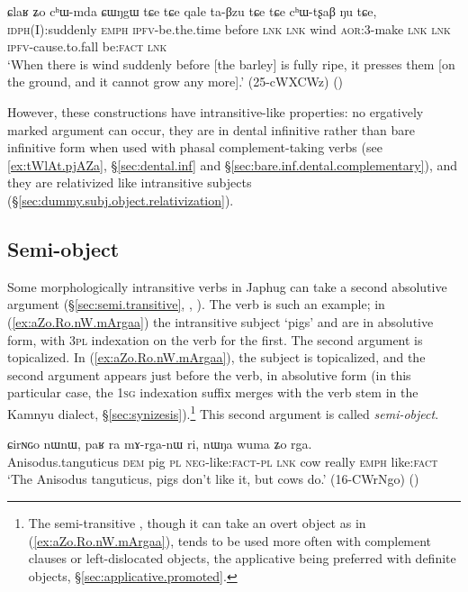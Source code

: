 \begin{exe}
\ex \label{ex:qale.taBzu}
 \gll ɕlaʁ ʑo cʰɯ-mda ɕɯŋgɯ tɕe tɕe qale ta-βzu tɕe tɕe cʰɯ-tʂaβ ŋu tɕe, \\
 \textsc{idph}(I):suddenly \textsc{emph} \textsc{ipfv}-be.the.time before  \textsc{lnk} \textsc{lnk} wind \textsc{aor}:3\flobv{}-make    \textsc{lnk} \textsc{lnk} \textsc{ipfv}-cause.to.fall be:\textsc{fact} \textsc{lnk} \\
 \glt `When there is wind suddenly before [the barley] is fully ripe, it presses them [on the ground, and it cannot grow any more].' (25-cWXCWz)
()
\end{exe}

However, these constructions have intransitive-like properties: no ergatively marked argument can occur, they are in dental infinitive rather than bare infinitive form when used with phasal complement-taking verbs (see \ref{ex:tWlAt.pjAZa}, §\ref{sec:dental.inf} and §\ref{sec:bare.inf.dental.complementary}), and they are relativized like intransitive subjects (§\ref{sec:dummy.subj.object.relativization}).

\subsection{Semi-object} \label{sec:semi.object}
Some morphologically intransitive verbs in Japhug can take a second absolutive argument (§\ref{sec:semi.transitive}, \citealt[4--5]{jacques16relatives},  \citealt[224]{jacques16complementation}). The verb  is such an example; in (\ref{ex:aZo.Ro.nW.mArgaa}) the intransitive subject  `pigs' and  are in absolutive form, with  \textsc{3pl} indexation on the verb for the first. The second argument   is topicalized. In (\ref{ex:aZo.Ro.nW.mArgaa}), the subject is topicalized, and the second argument   appears just before the verb, in absolutive form (in this particular case, the \textsc{1sg} indexation suffix merges with the verb stem in the Kamnyu dialect, §\ref{sec:synizesis}).\footnote{The semi-transitive , though it can take an overt object as in  (\ref{ex:aZo.Ro.nW.mArgaa}), tends to be used more often with complement clauses or left-dislocated objects, the applicative  being preferred with definite objects, §\ref{sec:applicative.promoted}.} This second argument is called \textit{semi-object}.

\begin{exe}
\ex \label{ex:paR.ra.mArganW}
\gll ɕirɴɢo nɯnɯ, paʁ ra mɤ-rga-nɯ ri, nɯŋa wuma ʑo rga.\\
Anisodus.tanguticus \textsc{dem} pig \textsc{pl} \textsc{neg}-like:\textsc{fact}-\textsc{pl} \textsc{lnk} cow really \textsc{emph} like:\textsc{fact} \\
\glt `The Anisodus tanguticus, pigs don't like it, but cows do.' (16-CWrNgo)
()
\end{exe}


